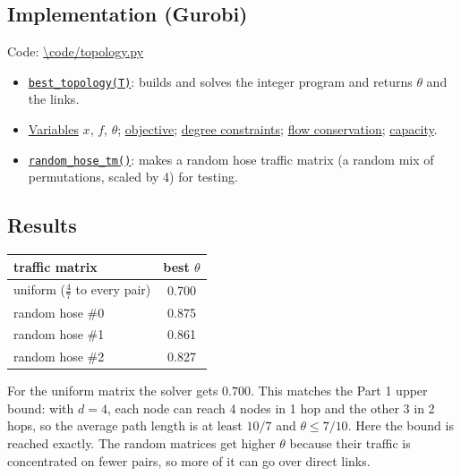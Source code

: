 \subsection*{Implementation (Gurobi)}

Code: \url{\code/topology.py}
\begin{itemize}
  \item \href{\code/topology.py\#L11-L51}{\texttt{best\_topology(T)}}: builds and solves the integer
        program and returns $\theta$ and the links.
  \item \href{\code/topology.py\#L18-L23}{Variables} $x$, $f$, $\theta$;
        \href{\code/topology.py\#L25}{objective};
        \href{\code/topology.py\#L27-L30}{degree constraints};
        \href{\code/topology.py\#L32-L40}{flow conservation};
        \href{\code/topology.py\#L42-L44}{capacity}.
  \item \href{\code/topology.py\#L54-L65}{\texttt{random\_hose\_tm()}}: makes a random hose traffic
        matrix (a random mix of permutations, scaled by 4) for testing.
\end{itemize}

\subsection*{Results}

\begin{center}
\begin{tabular}{l|c}
traffic matrix & best $\theta$ \\ \hline
uniform ($\frac{4}{7}$ to every pair) & 0.700 \\
random hose \#0 & 0.875 \\
random hose \#1 & 0.861 \\
random hose \#2 & 0.827 \\
\end{tabular}
\end{center}

For the uniform matrix the solver gets $0.700$. This matches the Part 1 upper bound: with $d = 4$,
each node can reach 4 nodes in 1 hop and the other 3 in 2 hops, so the average path length is at
least $10/7$ and $\theta \le 7/10$. Here the bound is reached exactly. The random matrices get higher
$\theta$ because their traffic is concentrated on fewer pairs, so more of it can go over direct links.
